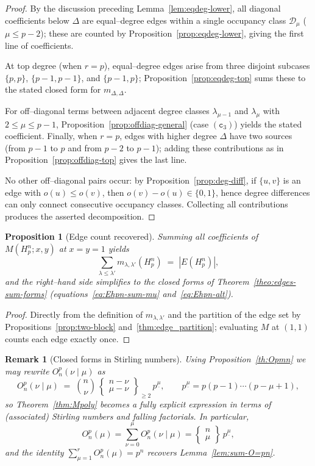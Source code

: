\documentclass[letterpaper,12pt]{article}
\newtheorem{proposition}{Proposition}
\newtheorem{remark}{Remark}
\begin{document}
\begin{proof}
By the discussion preceding Lemma~\ref{lem:eqdeg-lower}, all diagonal coefficients below $\Delta$
are equal–degree edges within a single occupancy class $\mathcal{D}_\mu$ ($\mu\le p-2$); these are
counted by Proposition~\ref{prop:eqdeg-lower}, giving the first line of coefficients.

At top degree (when $r=p$), equal–degree edges arise from three disjoint subcases
$\{p,p\}$, $\{p-1,p-1\}$, and $\{p-1,p\}$; Proposition~\ref{prop:eqdeg-top} sums these to the stated
closed form for $m_{\Delta,\Delta}$.

For off–diagonal terms between adjacent degree classes $\lambda_{\mu-1}$ and $\lambda_\mu$ with
$2\le \mu\le p-1$, Proposition~\ref{prop:offdiag-general} (case $(\texttt{c}_{3})$) yields the stated coefficient.
Finally, when $r=p$, edges with higher degree $\Delta$ have two sources (from $p-1$ to $p$ and
from $p-2$ to $p-1$); adding these contributions as in Proposition~\ref{prop:offdiag-top} gives the
last line.

No other off–diagonal pairs occur: by Proposition~\ref{prop:deg-diff}, if $\{u,v\}$ is an edge with
$o(u)\le o(v)$, then $o(v)-o(u)\in\{0,1\}$, hence degree differences can only connect consecutive
occupancy classes.  Collecting all contributions produces the asserted decomposition.
\end{proof}

\begin{proposition}[Edge count recovered]
Summing all coefficients of $M(H_p^n;x,y)$ at $x=y=1$ yields
\[
\sum_{\lambda\le \lambda'} m_{\lambda,\lambda'}(H_p^n) \;=\; |E(H_p^n)|,
\]
and the right–hand side simplifies to the closed forms of
Theorem~\ref{theo:edges-sum-forms} (equations~\eqref{eq:Ehpn-sum-mu} and~\eqref{eq:Ehpn-alt}).
\end{proposition}

\begin{proof}
Directly from the definition of $m_{\lambda,\lambda'}$ and the partition of the edge set by
Propositions~\ref{prop:two-block} and~\ref{thm:edge_partition}; evaluating $M$ at $(1,1)$ counts each
edge exactly once.
\end{proof}

\begin{remark}[Closed forms in Stirling numbers]
Using Proposition~\ref{th:Opmn} we may rewrite $O_n^p(\nu\mid \mu)$ as
\[
O_n^p(\nu\mid \mu)
\;=\;
\binom{n}{\nu}\,
\begin{Bmatrix} n-\nu \\ \mu-\nu \end{Bmatrix}_{\ge 2}\, p^{\underline{\mu}},
\qquad
p^{\underline{\mu}} = p(p-1)\cdots (p-\mu+1),
\]
so Theorem~\ref{thm:Mpoly} becomes a fully explicit expression in terms of (associated) Stirling
numbers and falling factorials.  In particular,
\[
O_n^p(\mu)=\sum_{\nu=0}^{\mu} O_n^p(\nu\mid \mu)
=
\begin{Bmatrix} n \\ \mu \end{Bmatrix}\,p^{\underline{\mu}},
\]
and the identity
\(
\sum_{\mu=1}^{r} O_n^p(\mu) = p^n
\)
recovers Lemma~\ref{lem:sum-O=pn}.
\end{remark}
\end{document}
